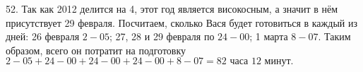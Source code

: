 52. Так как 2012 делится на 4, этот год является високосным, а значит в нём присутствует 29 февраля. Посчитаем, сколько Вася будет готовиться в каждый из дней: 26 февраля $2-05$; 27, 28 и 29 февраля по $24-00$; 1 марта $8-07.$ Таким образом, всего он потратит на подготовку $2-05+24-00+24-00+24-00+8-07=82\text{ часа }12\text{ минут.}$\\
